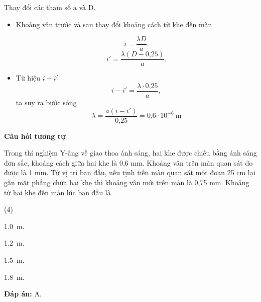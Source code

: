 \begin{dang}{Thay đổi các tham số a và D.}
{\begin{itemize}
	\item Khoảng vân trước và sau thay đổi khoảng cách từ khe đến màn
	
	\begin{equation*}
		i=\dfrac{\lambda D}{a}.
	\end{equation*}
	\begin{equation*}
	i'=\dfrac{\lambda (D-\text{0,25})}{a}.
	\end{equation*}
	\item Từ hiệu $i-i'$ 
	\begin{equation*}
		i-i'=\dfrac{\lambda \cdot \text{0,25}}{a},
	\end{equation*}
ta suy ra bước sóng
	\begin{equation*}
		\lambda = \dfrac{a(i-i')}{\text{0,25}}= \text {0,6} \cdot 10^{-6}\ \text{m}
	\end{equation*}
\end{itemize}

\begin{center}
	\textbf{Câu hỏi tương tự}
\end{center}

Trong thí nghiệm Y-âng về giao thoa ánh sáng, hai khe được chiếu bằng ánh sáng đơn sắc, khoảng cách giữa hai khe là 0,6 mm. Khoảng vân trên màn quan sát đo được là 1 mm. Từ vị trí ban đầu, nếu tịnh tiến màn quan sát một đoạn 25 cm lại gần mặt phẳng chứa hai khe thì khoảng vân mới trên màn là 0,75 mm. Khoảng từ hai khe đến màn lúc ban đầu là
\begin{mcq}(4)
\item  \SI{1,0}{\meter}.		
\item  \SI{1,2}{\meter}.		
\item  \SI{1,5}{\meter}.		
\item  \SI{1,8}{\meter}.
\end{mcq}

\textbf{Đáp án:} A.
}
\end{dang}

